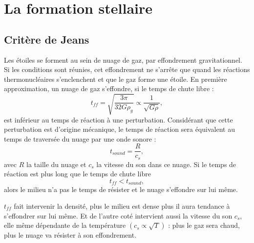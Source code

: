 


\section{La formation stellaire}

\subsection{Critère de Jeans}


Les étoiles se forment au sein de nuage de gaz, par effondrement gravitationnel.
Si les conditions sont réunies, cet effondrement ne s'arrête que quand les réactions thermonucléaires s'enclenchent et que le gaz forme une étoile.
En première approximation, un nuage de gaz s'effondre, si le temps de chute libre : 
\begin{equation}
t_{ff} =  \sqrt{\frac{3\pi}{32G\rho_g}} \propto \frac{1}{\sqrt{G \rho}},
\label{eq:tff}
\end{equation}
est inférieur au temps de réaction à une perturbation.
Considérant que cette perturbation est d'origine mécanique, le temps de réaction sera équivalent au temps de traversée du nuage par une onde sonore :
 \begin{equation}
t_{sound} = \frac{R}{c_s},
\end{equation}
avec $R$ la taille du nuage et $c_s$ la vitesse du son dans ce nuage.
Si le temps de réaction est plus long que le temps de chute libre
\begin{equation}
t_{ff} < t_{sound},
\end{equation}
alors le milieu n'a pas le temps de résister et le nuage s'effondre sur lui même.

$t_{ff}$ fait intervenir la densité, plus le milieu est dense plus il aura tendance à s'effondrer sur lui même.
Et de l'autre coté intervient aussi la vitesse du son $c_s$, elle même dépendante de la température $\left( c_s \propto \sqrt{T} \right)$ : plus le gaz sera chaud, plus le nuage va résister à son effondrement.


